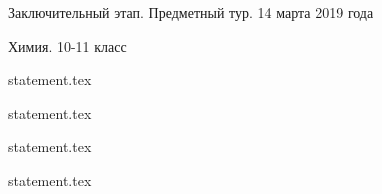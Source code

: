 \documentclass[a4paper,11pt, oneside]{book}
\begin{document}
\vspace{-3mm}
\vspace{-5mm}
\vspace{-5mm}

\normalsize

\begin{center}
    Заключительный этап. Предметный тур. 14 марта 2019 года
    
    Химия. 10-11 класс
\end{center}

\parindent=0cm

{statement.tex}

{statement.tex}

{statement.tex}

\clearpage

{statement.tex}
\end{document}
